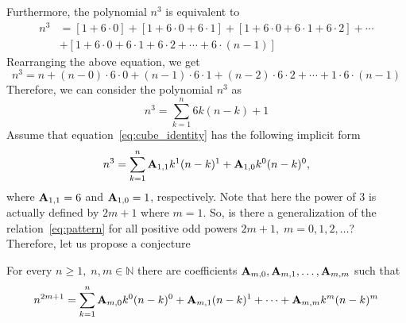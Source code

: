 Furthermore, the polynomial $n^3$ is equivalent to
\begin{align*}
    n^3 &= [1+6\cdot0]+[1+6\cdot0+6\cdot1]+[1+6\cdot0+6\cdot1+6\cdot2]+\cdots \\
    &+[1+6\cdot0+6\cdot1+6\cdot2+\cdots+6\cdot(n-1)]
\end{align*}
Rearranging the above equation, we get
\[
    n^3 = n +(n-0) \cdot6 \cdot0 + (n-1)\cdot6\cdot1 + (n-2)\cdot6\cdot2 + \cdots+1\cdot6\cdot(n-1)
\]
Therefore, we can consider the polynomial $n^3$ as
\begin{equation}
    \label{eq:cube_identity}
    n^3 = \sum_{k=1}^{n} 6k(n-k) + 1
\end{equation}
Assume that equation~\eqref{eq:cube_identity} has the following implicit form
\begin{equation}
    \label{eq:pattern}
    n^3 = \sum_{k=1}^{n} {\mathbf{A}} \sb{1,1} k^1(n-k)^1 + {\mathbf{A}} \sb{1,0} k^0(n-k)^0,
\end{equation}
where ${\mathbf{A}} \sb{1,1} = 6$ and ${\mathbf{A}} \sb{1,0} = 1$, respectively.
Note that here the power of $3$ is actually defined by $2m+1$ where $m=1$.
So, is there a generalization of the relation~\eqref{eq:pattern} for all positive odd powers $2m+1, \; m=0,1,2,\dots$?
Therefore, let us propose a conjecture
\begin{conj}
    For every $n\geq 1, \; n,m\in\mathbb{N}$ there are coefficients ${\mathbf{A}} \sb{m,0}, {\mathbf{A}} \sb{m,1}, \ldots, {\mathbf{A}} \sb{m,m}$ such that
    \begin{equation}
        \label{eq:odd_power_conjecture}
        n^{2m+1} = \sum_{k=1}^{n} {\mathbf{A}} \sb{m,0} k^0 (n-k)^0 + {\mathbf{A}} \sb{m,1} (n-k)^1
        + \cdots + {\mathbf{A}} \sb{m,m} k^m (n-k)^m
    \end{equation}
\end{conj}
